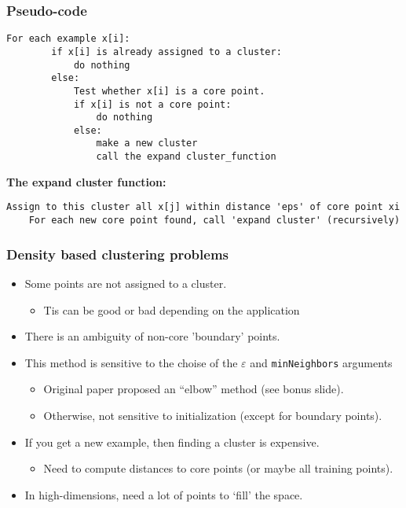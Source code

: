 \documentclass{article}
\def\gre#1{{\color{gre}#1}}
\def\red#1{{\color{red}#1}}
\theoremstyle{definition}
\begin{document}
\subsubsection*{Pseudo-code}
\begin{lstlisting}[tabsize=3]
	For each example x[i]:
		if x[i] is already assigned to a cluster: 
			do nothing
		else:
			Test whether x[i] is a core point.
			if x[i] is not a core point:
				do nothing
			else:
				make a new cluster
				call the expand cluster_function
\end{lstlisting}
\textbf{The expand cluster function:}
\begin{lstlisting}[tabsize=3]
	Assign to this cluster all x[j] within distance 'eps' of core point xi
	For each new core point found, call 'expand cluster' (recursively)
\end{lstlisting}

\subsubsection*{Density based clustering problems}
\begin{itemize}
	\item Some points are not assigned to a cluster. 
	\begin{itemize}
		\item Tis can be good or bad depending on the application
	\end{itemize}
	\item There is an ambiguity of non-core 'boundary' points. 
	\item This method is \red{sensitive} to the choise of the $\varepsilon$ and \texttt{minNeighbors} arguments
	\begin{itemize}
		\item Original paper proposed an “elbow” method (see bonus slide).
		\item Otherwise, \gre{not sensitive to initialization} (except for boundary points).
	\end{itemize}
\item If you get a new example, then \gre{finding a cluster is expensive}.
\begin{itemize}
	\item Need to compute distances to core points (or maybe all training points).
\end{itemize}
\item In high-dimensions, need a lot of points to ‘fill' the space.
\end{itemize}
\end{document}
